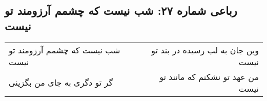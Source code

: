 \begin{center}
\section*{رباعی شماره ۲۷: شب نیست که چشمم آرزومند تو نیست}
\label{sec:027}
\begin{longtable}{l p{0.5cm} r}
شب نیست که چشمم آرزومند تو نیست
&&
وین جان به لب رسیده در بند تو نیست
\\
گر تو دگری به جای من بگزینی
&&
من عهد تو نشکنم که مانند تو نیست
\\
\end{longtable}
\end{center}
